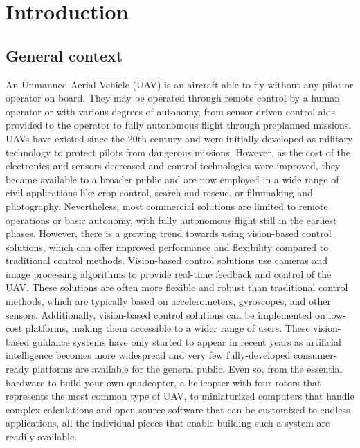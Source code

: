 \cleardoublepage
\chapter{Introduction}
\label{sec:intro}

\section{General context}

An Unmanned Aerial Vehicle (UAV) is an aircraft able to fly without any pilot or operator on board. They may be operated through remote control by a human operator or with various degrees of autonomy, from sensor-driven control aids provided to the operator to fully autonomous flight through preplanned missions.
UAVs have existed since the 20th century and were initially developed as military technology to protect pilots from dangerous missions.
However, as the cost of the electronics and sensors decreased and control technologies were improved, they became available to a broader public and are now employed in a wide range of civil applications like crop control, search and rescue, or filmmaking and photography.
Nevertheless, most commercial solutions are limited to remote operations or basic autonomy, with fully autonomous flight still in the earliest phases.
However, there is a growing trend towards using vision-based control solutions, which can offer improved performance and flexibility compared to traditional control methods.
Vision-based control solutions use cameras and image processing algorithms to provide real-time feedback and control of the UAV. 
These solutions are often more flexible and robust than traditional control methods, which are typically based on accelerometers, gyroscopes, and other sensors. 
Additionally, vision-based control solutions can be implemented on low-cost platforms, making them accessible to a wider range of users.
These vision-based guidance systems have only started to appear in recent years as artificial intelligence becomes more widespread and very few fully-developed consumer-ready platforms are available for the general public.
Even so,
from the essential hardware to build your own quadcopter, a helicopter with four rotors that represents the most common type of UAV, to miniaturized computers that handle complex calculations and open-source software that can be customized to endless applications,
all the individual pieces that enable building such a system are readily available.

